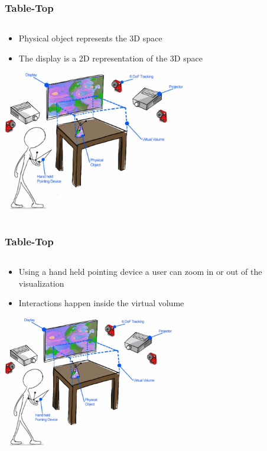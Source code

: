 \documentclass{beamer}
\begin{document}
\begin{frame}
\frametitle{Table-Top} 
	\begin{columns}
    \begin{column}{0.9\textwidth}
    \begin{itemize}
		\item Physical object represents the 3D space
		\item The display is a 2D representation of the 3D space
	\end{itemize}
	\begin{center}
	\includegraphics[width=8cm]{../Sample_paper/images/Tabletop}
	\end{center}
	\end{column}
    \end{columns}
\end{frame}

\begin{frame}
\frametitle{Table-Top} 
	\begin{columns}
    \begin{column}{0.9\textwidth}
    \begin{itemize}
		\item Using a hand held pointing device a user can zoom in or out of the visualization 
		\item Interactions happen inside the virtual volume
	\end{itemize}
	\begin{center}
	\includegraphics[width=7.5cm]{../Sample_paper/images/Tabletop}
	\end{center}
	\end{column}
    \end{columns}
\end{frame}
\end{document}
